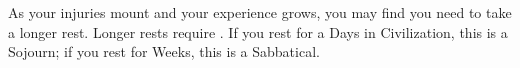 {  
  As your injuries mount and your experience grows,  you may find you need to take a longer rest.  Longer rests require .  If you rest for a Days in Civilization, this is a Sojourn; if you rest for Weeks, this is a Sabbatical. 

} %